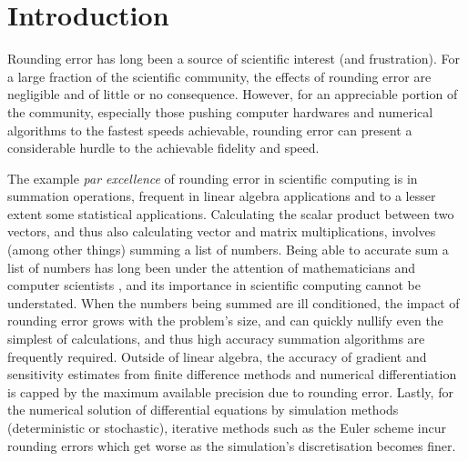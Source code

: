 \documentclass[manuscript,review]{acmart}
\begin{document}

\maketitle

\section{Introduction}
\label{sec:introduction}

Rounding error has long been a source of scientific interest (and frustration). For a large fraction of the scientific community, the effects of rounding error are negligible and of little or no consequence. However, for an appreciable portion of the community, especially those pushing computer hardwares and numerical algorithms to the fastest speeds achievable, rounding error can present a considerable hurdle to the achievable fidelity and speed.

The example \textit{par excellence} of rounding error in scientific computing is in summation operations, frequent in linear algebra applications and to a lesser extent some statistical applications. Calculating the scalar product between two vectors, and thus also calculating vector and matrix multiplications, involves (among other things) summing a list of numbers. Being able to accurate sum a list of numbers has long been under the attention of mathematicians and computer scientists \citep{knuth2014art,kahan1965further,higham1993accuracy,trefethen1997numerical}, and its importance in scientific computing cannot be understated. When the numbers being summed are ill conditioned, the impact of rounding error grows with the problem's size, and can quickly nullify even the simplest of calculations, and thus high accuracy summation algorithms are frequently required. Outside of linear algebra, the accuracy of gradient and sensitivity estimates from finite difference methods and numerical differentiation is capped by the maximum available precision due to rounding error. Lastly, for the numerical solution of differential equations by simulation methods (deterministic or stochastic), iterative methods such as the Euler scheme incur rounding errors which get worse as the simulation's discretisation becomes finer. 
\end{document}
